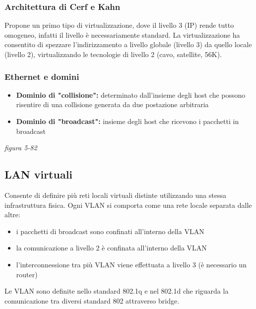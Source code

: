 \documentclass[
]{article}
\begin{document}
\hypertarget{header-n287}{%
\subsubsection{Architettura di Cerf e Kahn}\label{header-n287}}

Propone un primo tipo di virtualizzazione, dove il livello 3 (IP) rende
tutto omogeneo, infatti il livello è necessariamente standard. La
virtualizzazione ha consentito di spezzare l'indirizzamento a livello
globale (livello 3) da quello locale (livello 2), virtualizzando le
tecnologie di livello 2 (cavo, satellite, 56K).

\hypertarget{header-n289}{%
\subsubsection{Ethernet e domini}\label{header-n289}}

\begin{itemize}
\item
  \textbf{Dominio di "collisione": }determinato dall'insieme degli host
  che possono risentire di una collisione generata da due postazione
  arbitraria
\item
  \textbf{Dominio di "broadcast": }insieme degli host che ricevono i
  pacchetti in broadcast
\end{itemize}

\emph{figura 5-82}

\hypertarget{header-n296}{%
\subsection{LAN virtuali}\label{header-n296}}

Consente di definire più reti locali virtuali distinte utilizzando una
stessa infrastruttura fisica. Ogni VLAN si comporta come una rete locale
separata dalle altre:

\begin{itemize}
\item
  i pacchetti di broadcast sono confinati all'interno della VLAN
\item
  la comunicazione a livello 2 è confinata all'interno della VLAN
\item
  l'interconnessione tra più VLAN viene effettuata a livello 3 (è
  necessario un router)
\end{itemize}

Le VLAN sono definite nello standard 802.1q e nel 802.1d che riguarda la
comunicazione tra diversi standard 802 attraverso bridge.
\end{document}

